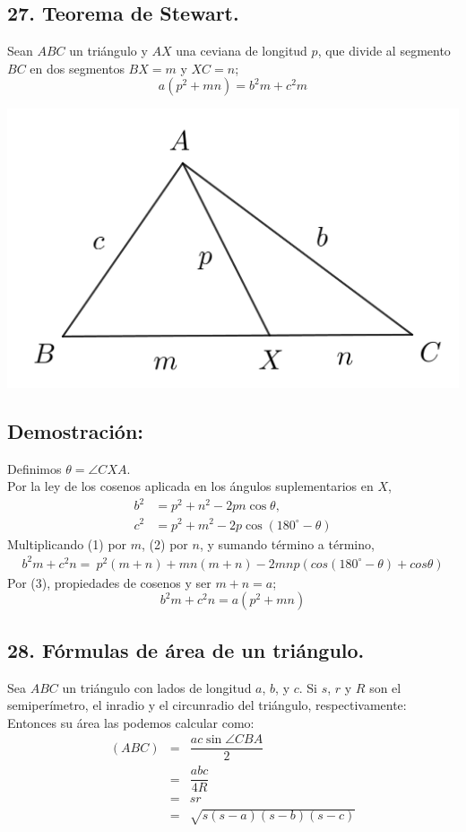 \documentclass[12pt,a4paper]{article}
\begin{document}
\subsection*{27. Teorema de Stewart.}
Sean $ABC$ un triángulo y $AX$ una ceviana de longitud $p$, que divide al segmento $BC$ en dos segmentos $BX=m$ y $XC=n$; $$a(p^2 +mn) = b^2m + c^2m$$
\begin{center}
\includegraphics[scale=0.6]{stewart.png} 
\end{center}
\subsection*{Demostración:}
Definimos $\theta=\angle CXA$.
\\Por la ley de los cosenos aplicada en los ángulos suplementarios en $X$,
\setcounter{equation}{0}
\begin{align}
b^2&= p^2 + n^2-2pn \cos \theta,\\
c^2&= p^2 + m^2-2p \cos (180^{\circ}-\theta)
\end{align}
Multiplicando (1) por $m$, (2) por $n$, y sumando término a término, 
\begin{eqnarray}
b^2m + c^2n=\ p^2(m+n)+mn(m+n)-2mnp(cos(180^{\circ}-\theta)+cos \theta )
\end{eqnarray}
Por (3), propiedades de cosenos y ser $m+n=a$;
$$b^2m + c^2n=a(p^2+mn)$$
\subsection*{28. Fórmulas de área de un triángulo.}
Sea $ABC$ un triángulo con lados de longitud $a$, $b$, y $c$. Si $s$, $r$ y $R$ son el semiperímetro, el inradio y el circunradio del triángulo, respectivamente: Entonces su área las podemos calcular como:
\begin{eqnarray*}
(ABC)&=& \dfrac{ac \sin \angle CBA}{2}
\\&=& \dfrac{abc}{4R}
\\&=& sr
\\&=& \sqrt{s(s-a)(s-b)(s-c)}
\end{eqnarray*}
\end{document}
